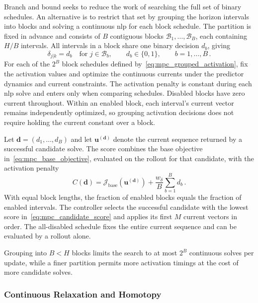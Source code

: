 Branch and bound seeks to reduce the work of searching the full set of binary schedules.
An alternative is to restrict that set by grouping the horizon intervals into blocks and solving a continuous \ac{nlp} for each block schedule.
The partition is fixed in advance and consists of $B$ contiguous blocks $\mathcal B_1,\ldots,\mathcal B_B$, each containing $H/B$ intervals.
All intervals in a block share one binary decision $d_b$, giving
%
\begin{equation}
    \delta_{j|k}=d_b
    \quad\text{for }j\in\mathcal B_b,
    \qquad d_b\in\{0, 1\},
    \qquad b=1,\ldots,B\,.
    \label{eq:mpc_grouped_activation}
\end{equation}
%
For each of the $2^B$ block schedules defined by~\eqref{eq:mpc_grouped_activation}, fix the activation values and optimize the continuous currents under the predictor dynamics and current constraints.
The activation penalty is constant during each \ac{nlp} solve and enters only when comparing schedules.
Disabled blocks have zero current throughout.
Within an enabled block, each interval's current vector remains independently optimized, so grouping activation decisions does not require holding the current constant over a block.

Let $\mathbf d=(d_1,\ldots,d_B)$ and let $\mathbf u^{(\mathbf d)}$ denote the current sequence returned by a successful candidate solve.
The score combines the base objective in~\eqref{eq:mpc_base_objective}, evaluated on the rollout for that candidate, with the activation penalty
%
\begin{equation}
    C(\mathbf d)
    =\mathcal J_{\mathrm{base}}\!\left(\mathbf u^{(\mathbf d)}\right)
     +\frac{w_{\delta}}{B}\sum_{b=1}^{B}d_b\,.
    \label{eq:mpc_candidate_score}
\end{equation}
%
With equal block lengths, the fraction of enabled blocks equals the fraction of enabled intervals.
The controller selects the successful candidate with the lowest score in~\eqref{eq:mpc_candidate_score} and applies its first $M$ current vectors in order.
The all-disabled schedule fixes the entire current sequence and can be evaluated by a rollout alone.

Grouping into $B<H$ blocks limits the search to at most $2^B$ continuous solves per update, while a finer partition permits more activation timings at the cost of more candidate solves.

\subsubsection*{Continuous Relaxation and Homotopy}

